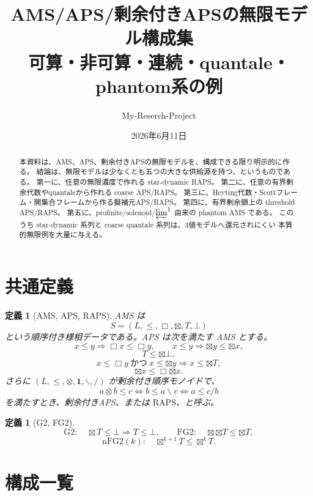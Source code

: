 \documentclass[uplatex,dvipdfmx,a4paper,10pt]{jsarticle}
\title{AMS/APS/剰余付きAPSの無限モデル構成集\\
{\large 可算・非可算・連続・quantale・phantom系の例}}
\author{My-Reserch-Project}
\date{2026年6月11日}
\newtheorem{definition}[theorem]{定義}
\newcommand{\RAPS}{\mathrm{RAPS}}
\newcommand{\Gtwo}{\mathrm{G2}}
\newcommand{\FGtwo}{\mathrm{FG2}}
\newcommand{\nFGtwo}{\mathrm{nFG2}}
\newcommand{\bt}{\boxtimes}
\newcommand{\resl}{\backslash}
\newcommand{\resr}{/}
\begin{document}
\maketitle

\begin{abstract}
本資料は、AMS、APS、剰余付きAPSの無限モデルを、構成できる限り明示的に作る。
結論は、無限モデルは少なくとも五つの大きな供給源を持つ、というものである。
第一に、任意の無限濃度で作れる star-dynamic RAPS。
第二に、任意の有界剰余代数やquantaleから作れる coarse APS/RAPS。
第三に、Heyting代数・Scottフレーム・開集合フレームから作る擬補元APS/RAPS。
第四に、有界剰余鎖上の threshold APS/RAPS。
第五に、profinite/solenoid/\(\varprojlim^1\) 由来の phantom AMS である。
このうち star-dynamic 系列と coarse quantale 系列は、3値モデルへ還元されにくい
本質的無限例を大量に与える。
\end{abstract}

\section{共通定義}

\begin{definition}[AMS, APS, RAPS]
AMS は
\[
S=(L,\le,\Box,\bt,T,\bot)
\]
という順序付き様相データである。APS は次を満たす AMS とする。
\[
x\le y\Rightarrow \Box x\le\Box y,\qquad
x\le y\Rightarrow \bt y\le\bt x,
\]
\[
T\le\bt\bot,
\]
\[
x\le\Box y\ \text{かつ}\ x\le\bt y\Rightarrow x\le\bt T,
\]
\[
\bt x\le\Box\bt x.
\]
さらに \((L,\le,\otimes,\mathbf 1,\resl,\resr)\) が剰余付き順序モノイドで、
\[
a\otimes b\le c
\iff
b\le a\resl c
\iff
a\le c\resr b
\]
を満たすとき、剰余付きAPS、または \(\RAPS\)、と呼ぶ。
\end{definition}

\begin{definition}[G2, FG2]
\[
\Gtwo:\quad \bt T\le\bot\Rightarrow T\le\bot,
\qquad
\FGtwo:\quad \bt\bt T\le\bt T,
\]
\[
\nFGtwo(k):\quad \bt^{k+1}T\le\bt^kT.
\]
\end{definition}

\section{構成一覧}
\end{document}
